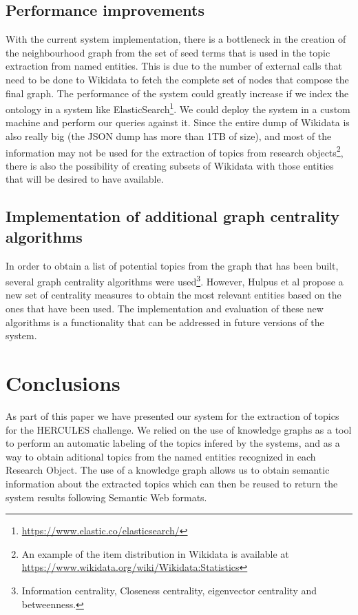 \documentclass[runningheads]{llncs}
\begin{document}
\subsection{Performance improvements}
With the current system implementation, there is a bottleneck in the creation of the neighbourhood graph from the set of seed terms that is used in the topic extraction from named entities. This is due to the number of external calls that need to be done to Wikidata to fetch the complete set of nodes that compose the final graph. The performance of the system could greatly increase if we index the ontology in a system like ElasticSearch\footnote{\url{https://www.elastic.co/elasticsearch/}}. We could deploy the system in a custom machine and perform our queries against it. Since the entire dump of Wikidata is also really big (the JSON dump has more than 1TB of size), and most of the information may not be used for the extraction of topics from research objects\footnote{An example of the item distribution in Wikidata is available at \url{https://www.wikidata.org/wiki/Wikidata:Statistics}}, there is also the possibility of creating subsets of Wikidata with those entities that will be desired to have available.

\subsection{Implementation of additional graph centrality algorithms}
In order to obtain a list of potential topics from the graph that has been built, several graph centrality algorithms were used\footnote{Information centrality, Closeness centrality, eigenvector centrality and betweenness.}. However, Hulpus et al \cite{hulpus2013unsupervised} propose a new set of centrality measures to obtain the most relevant entities based on the ones that have been used. The implementation and evaluation of these new algorithms is a functionality that can be addressed in future versions of the system.


\section{Conclusions} \label{conclusions}
As part of this paper we have presented our system for the extraction of topics for the HERCULES challenge. We relied on the use of knowledge graphs as a tool to perform an automatic labeling of the topics infered by the systems, and as a way to obtain aditional topics from the named entities recognized in each Research Object. The use of a knowledge graph allows us to obtain semantic information about the extracted topics which can then be reused to return the system results following Semantic Web formats.
\end{document}
